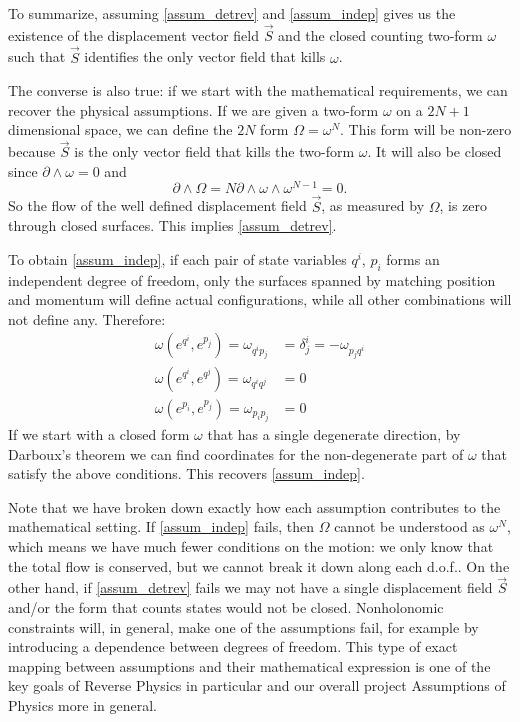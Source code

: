 \documentclass[fleqn,10pt]{wlscirep}
\begin{document}
To summarize, assuming \ref{assum_detrev} and \ref{assum_indep} gives us the existence of the displacement vector field $\vec{S}$ and the closed counting two-form $\omega$ such that $\vec{S}$ identifies the only vector field that kills $\omega$.

The converse is also true: if we start with the mathematical requirements, we can recover the physical assumptions. If we are given a two-form $\omega$ on a $2N+1$ dimensional space, we can define the $2N$ form $\Omega = \omega^N$. This form will be non-zero because $\vec{S}$ is the only vector field that kills the two-form $\omega$. It will also be closed since $\partial \wedge \omega = 0$ and
\begin{equation}
	\partial \wedge \Omega = N\partial \wedge \omega \wedge \omega^{N-1} = 0.
\end{equation}
So the flow of the well defined displacement field $\vec{S}$, as measured by $\Omega$, is zero through closed surfaces. This implies \ref{assum_detrev}.

To obtain \ref{assum_indep}, if each pair of state variables $q^i$, $p_i$ forms an independent degree of freedom, only the surfaces spanned by matching position and momentum will define actual configurations, while all other combinations will not define any. Therefore:
\begin{equation}\label{canonical_conditions}
	\begin{aligned}
		\omega(e^{q^i}, e^{p_j}) = \omega_{q^i p_j} &= \delta^i_j = - \omega_{p_j q^i} \\
		\omega(e^{q^i}, e^{q^j}) = \omega_{q^i q^j} &= 0 \\
		\omega(e^{p_i}, e^{p_j}) = \omega_{p_i p_j} &= 0
	\end{aligned}
\end{equation}
If we start with a closed form $\omega$ that has a single degenerate direction, by Darboux's theorem we can find coordinates for the non-degenerate part of $\omega$ that satisfy the above conditions. This recovers \ref{assum_indep}.

Note that we have broken down exactly how each assumption contributes to the mathematical setting. If \ref{assum_indep} fails, then $\Omega$ cannot be understood as $\omega^N$, which means we have much fewer conditions on the motion: we only know that the total flow is conserved, but we cannot break it down along each d.o.f.. On the other hand, if \ref{assum_detrev} fails we may not have a single displacement field $\vec{S}$ and/or the form that counts states would not be closed. Nonholonomic constraints will, in general, make one of the assumptions fail, for example by introducing a dependence between degrees of freedom. This type of exact mapping between assumptions and their mathematical expression is one of the key goals of Reverse Physics in particular and our overall project Assumptions of Physics more in general.
\end{document}
